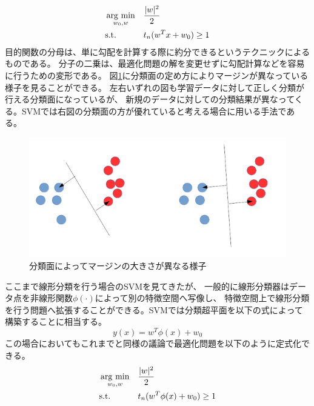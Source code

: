 \begin{equation}
    \begin{aligned}
    & \mathop{\rm arg~min}\limits_{w_0,w}
    & & \frac{|w|^2}{2}  \\
    & \text{s.t.}
    & &  t_n(w^Tx+w_0)  \geq 1 
    \end{aligned}
    \label{eq:obj nonlinear}
\end{equation}
目的関数の分母は、単に勾配を計算する際に約分できるというテクニックによるものである。
分子の二乗は、最適化問題の解を変更せずに勾配計算などを容易に行うための変形である。
図\ref{fig:margin}に分類面の定め方によりマージンが異なっている様子を見ることができる。
左右いずれの図も学習データに対して正しく分類が行える分類面になっているが、
新規のデータに対しての分類結果が異なってくる。SVMでは右図の分類面の方が優れていると考える場合に用いる手法である。
\begin{figure}
    \centering
    \includegraphics[width=12cm]{images/margin.png}
    \caption{分類面によってマージンの大きさが異なる様子}
    \label{fig:margin}
\end{figure}
ここまで線形分類を行う場合のSVMを見てきたが、
一般的に線形分類器はデータ点を非線形関数\(\phi(\cdot)\)によって別の特徴空間へ写像し、
特徴空間上で線形分類を行う問題へ拡張することができる。SVMでは分類超平面を以下の式によって構築することに相当する。
\begin{equation}
    y(x) = w^T \phi (x) + w_0
    \label{eq:displane}
\end{equation}
この場合においてもこれまでと同様の議論で最適化問題を以下のように定式化できる。
\begin{equation}
    \begin{aligned}
    & \mathop{\rm arg~min}\limits_{w_0,w}
    & & \frac{|w|^2}{2} \\
    & \text{s.t.}
    & &  t_n(w^T\phi(x)+w_0)  \geq 1 
    \end{aligned}
    \label{eq:obj nonlinear}
\end{equation}

